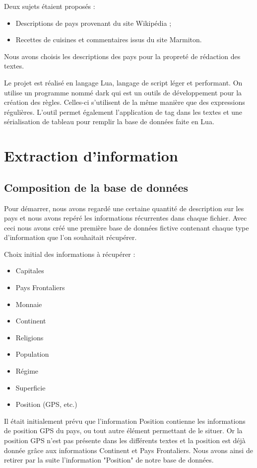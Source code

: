 \documentclass[11pt,a4paper]{article}
\begin{document}
Deux sujets étaient proposés :
\begin{itemize}
	\item Descriptions de pays provenant du site Wikipédia ;
	\item Recettes de cuisines et commentaires issus du site Marmiton.
\end{itemize}

Nous avons choisis les descriptions des pays pour la propreté de rédaction des textes.

Le projet est réalisé en langage Lua, langage de script léger et performant.
On utilise un programme nommé dark qui est un outils de développement pour la création des règles.
Celles-ci s'utilisent de la même manière que des expressions régulières.
L'outil permet également l'application de tag dans les textes et une sérialisation de tableau pour remplir la base de données faite en Lua. 


\clearpage

\section{Extraction d'information}

\subsection{Composition de la base de données}

Pour démarrer, nous avons regardé une certaine quantité de description sur les pays et nous avons repéré les informations récurrentes dans chaque fichier.
Avec ceci nous avons créé une première base de données fictive contenant chaque type d'information que l'on souhaitait récupérer.

Choix initial des informations à récupérer :
\begin{itemize}
	\item Capitales
	\item Pays Frontaliers
	\item Monnaie
	\item Continent
	\item Religions
	\item Population
	\item Régime
	\item Superficie
	\item Position (GPS, etc.)
\end{itemize}

Il était initialement prévu que l'information Position contienne les informations de position GPS du pays, ou tout autre élément permettant de le situer.
Or la position GPS n'est pas présente dans les différents textes et la position est déjà donnée grâce aux informations Continent et Pays Frontaliers.
Nous avons ainsi de retirer par la suite l'information "Position" de notre base de données.
\end{document}
